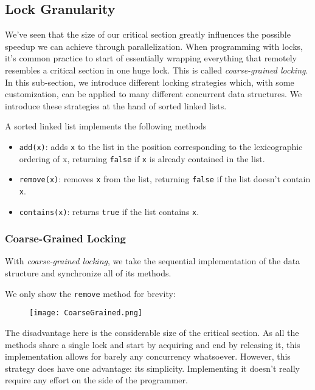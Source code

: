 \documentclass[main]{subfiles}
\begin{document}
\subsection{Lock Granularity}
We've seen that the size of our critical section greatly influences the possible speedup we can achieve through parallelization. When programming with locks, it's common practice to start of essentially wrapping everything that remotely resembles a critical section in one huge lock. This is called \textit{coarse-grained locking}. In this sub-section, we introduce different locking strategies which, with some customization, can be applied to many different concurrent data structures. We introduce these strategies at the hand of sorted linked lists. 
\begin{example}
    A sorted linked list implements the following methods
    \begin{itemize}
        \item \texttt{add(x)}: adds \texttt{x} to the list in the position corresponding to the lexicographic ordering of x, returning \texttt{false} if \texttt{x} is already contained in the list.
        \item \texttt{remove(x)}: removes \texttt{x} from the list, returning \texttt{false} if the list doesn't contain \texttt{x}.
        \item \texttt{contains(x)}: returns \texttt{true} if the list contains \texttt{x}.
    \end{itemize}
\end{example}

\subsubsection{Coarse-Grained Locking}
With \textit{coarse-grained locking}, we take the sequential implementation of the data structure and synchronize all of its methods.
\begin{example}
    We only show the \texttt{remove} method for brevity:
    \begin{figure}[H]
        \centering
        \texttt{[image: CoarseGrained.png]}
    \end{figure}
\end{example}
The disadvantage here is the considerable size of the critical section. As all the methods share a single lock and start by acquiring and end by releasing it, this implementation allows for barely any concurrency whatsoever. However, this strategy does have one advantage: its simplicity. Implementing it doesn't really require any effort on the side of the programmer.
\newpage
\end{document}
